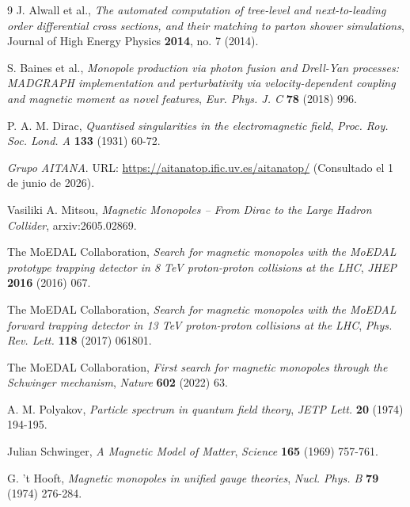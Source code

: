 \documentclass[12pt, a4paper]{article}
\begin{document}
\small
\begin{thebibliography}{9}
J. Alwall et al.,
\emph{The automated computation of tree-level and next-to-leading order differential cross sections, and their matching to parton shower simulations},
Journal of High Energy Physics \textbf{2014}, no. 7 (2014).

S. Baines et al., \emph{Monopole production via photon fusion and Drell-Yan processes: MADGRAPH implementation and perturbativity via velocity-dependent coupling and magnetic moment as novel features}, \emph{Eur. Phys. J. C} {\bf 78} (2018) 996.

P. A. M. Dirac, \emph{Quantised singularities in the electromagnetic field}, \emph{Proc. Roy. Soc. Lond. A} {\bf 133} (1931) 60-72.

\textit{Grupo AITANA}. URL: \url{https://aitanatop.ific.uv.es/aitanatop/} (Consultado el 1 de junio de 2026).

Vasiliki A. Mitsou, \emph{Magnetic Monopoles -- From Dirac to the Large Hadron Collider}, arxiv:2605.02869.

The MoEDAL Collaboration, \emph{Search for magnetic monopoles with the MoEDAL prototype trapping detector in 8 TeV proton-proton collisions at the LHC}, \emph{JHEP} {\bf 2016} (2016) 067.

The MoEDAL Collaboration, \emph{Search for magnetic monopoles with the MoEDAL forward trapping detector in 13 TeV proton-proton collisions at the LHC}, \emph{Phys. Rev. Lett.} {\bf 118} (2017) 061801.

The MoEDAL Collaboration, \emph{First search for magnetic monopoles through the Schwinger mechanism}, \emph{Nature} {\bf 602} (2022) 63.

A. M. Polyakov, \emph{Particle spectrum in quantum field theory}, \emph{JETP Lett.} {\bf 20} (1974) 194-195.

Julian Schwinger, \emph{A Magnetic Model of Matter}, \emph{Science} {\bf 165} (1969) 757-761.

G. 't Hooft, \emph{Magnetic monopoles in unified gauge theories}, \emph{Nucl. Phys. B} {\bf 79} (1974) 276-284.

\end{thebibliography}
\end{document}
